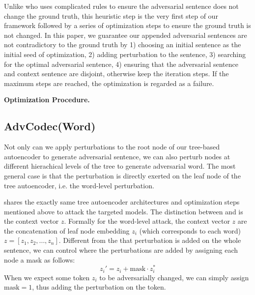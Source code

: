 Unlike \citet{jia-liang-2017-adversarial} who uses complicated rules to ensure the adversarial sentence does not change the ground truth, this heuristic step is the very first step of our framework followed by a series of optimization steps to ensure the ground truth is not changed. In this paper, we guarantee our appended adversarial sentences are not contradictory to the ground truth by 1) choosing an initial sentence as the initial seed of optimization, 2) adding perturbation to the sentence, 3) searching for the optimal adversarial sentence, 4) ensuring that the adversarial sentence and context sentence are disjoint, otherwise keep the iteration steps. If the maximum steps are reached, the optimization is regarded as a failure. 

\textbf{Optimization Procedure.} 





\subsection{AdvCodec(Word)}

Not only can we apply perturbations to the root node of our tree-based autoencoder to generate adversarial sentence, we can also perturb nodes at different hierachical levels of the tree to generate adversarial word. The most general case is that the perturbation is directly exerted on the leaf node of the tree autoencoder, i.e. the word-level perturbation. 

\advcodecword shares the exactly same tree autoencoder architectures and optimization steps mentioned above to attack the targeted models. The distinction between \advcodecword and \advcodecsent is the context vector $z$. Formally for the word-level attack, the context vector $z$ are the concatenation of leaf node embedding $z_i$ (which corresponds to each word) $z = [z_1, z_2, …, z_n]$.
Different from the \advcodecsent that perturbation is added on the whole sentence, we can control where the perturbations are added by assigning each node a mask as follows:
\begin{equation}
    z_i' = z_i + \text{mask} \cdot z_i^*
\end{equation}
 When we expect some token $z_i$ to be adversarially changed, we can simply assign $\text{mask} = 1$, thus adding the perturbation on the token. 
 
